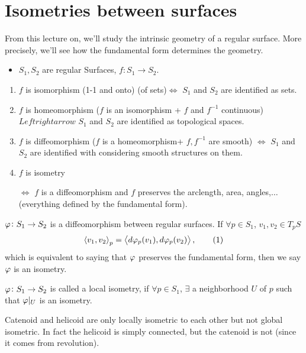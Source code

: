 \section{Isometries between surfaces}
From this lecture on, we'll study the intrinsic geometry of a regular 
surface. More precisely, we'll see how the  fundamental
form determines the geometry.
\begin{itemize}
    \item \(S_1,S_2\) are regular Surfaces, \(f\colon S_1\to S_2\).
\end{itemize}
\begin{enumerate}[(1)]
    \item \(f\) is isomorphism (1-1 and onto) 
    (of sets)\(\Leftrightarrow \)
    \(S_1\) and \(S_2\) are identified as sets.
    \item \(f\) is homeomorphism (\(f\) is an isomorphism + \(f\)
    and \(f^{-1}\) continuous)\(Leftrightarrow\) \(S_1\) and \(S_2\)
    are identified as topological spaces.
    \item \(f\) is diffeomorphism (\(f\) is a homeomorphism+
    \(f,f^{-1}\) are smooth) \(\Leftrightarrow\) \(S_1\) and \(S_2\)
    are identified with considering smooth structures on them.
    \item \(f\) is isometry 
    
    \(\Leftrightarrow\) \(f\)
    is a diffeomorphism and \(f\) preserves the arclength, 
    area, angles,\(\ldots\)(everything defined by the 
     fundamental form).
\end{enumerate}
\begin{definition}[Isometry]
    \(\varphi\colon S_1\to S_2\) is a diffeomorphism between regular 
    surfaces. If \(\forall p\in S_1\), \(v_1,v_2\in T_p S\)
    \[
        \left\langle v_1,v_2\right\rangle_p=
        \left\langle d\varphi_p(v_1),d\varphi_p(v_2)\right\rangle,
        \tag{1}\label{definition of isometry}
    \]
    which is equivalent to saying that \(\varphi\) preserves the 
     fundamental form, then we say \(\varphi\) is 
    an isometry.
\end{definition}
\begin{definition}
    \(\varphi\colon S_1\to S_2\) is called a local isometry, if 
    \(\forall p\in S_1\), \(\exists\) a neighborhood \(U\) of 
    \(p\) such that \(\varphi|_U\) is an isometry.
\end{definition}
\begin{example}
    Catenoid and helicoid are only locally isometric to each other but not 
    global isometric. In fact the helicoid is simply connected, but 
    the catenoid is not (since it comes from revolution).
\end{example}
